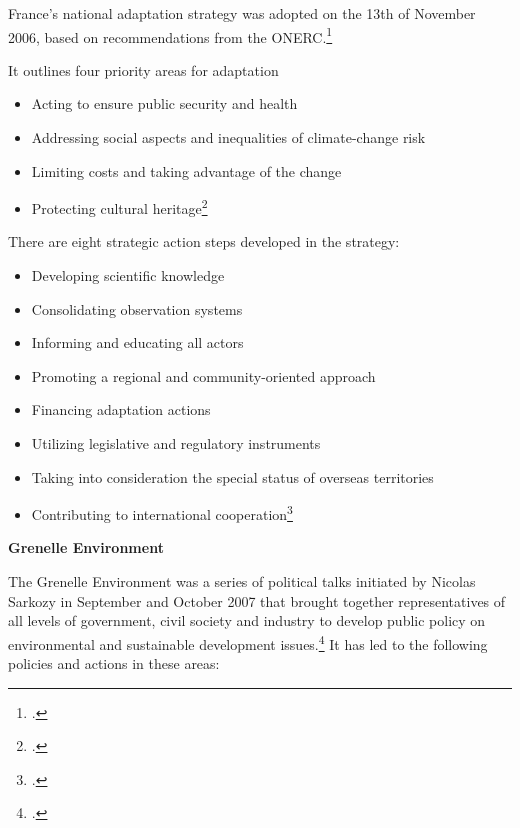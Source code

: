 France's national adaptation strategy was adopted on the 13th of November 2006, based on recommendations from the ONERC.\footcite[][]{SNAAC}


It outlines four priority areas for adaptation
\begin{itemize}
	\item Acting to ensure public security and health
	\item Addressing social aspects and inequalities of climate-change risk
	\item Limiting costs and taking advantage of the change
	\item Protecting cultural heritage\footcite[][]{SNAAC}
\end{itemize}


There are eight strategic action steps developed in the strategy:
\begin{itemize}
	\item Developing scientific knowledge
	\item Consolidating observation systems
	\item Informing and educating all actors
	\item Promoting a regional and community-oriented approach
	\item Financing adaptation actions
	\item Utilizing legislative and regulatory instruments
	\item Taking into consideration the special status of overseas territories
	\item Contributing to international cooperation\footcite[][]{SNAAC}
\end{itemize}



\textbf{Grenelle Environment}



The Grenelle Environment was a series of political talks initiated by Nicolas Sarkozy in September and October 2007 that brought together representatives of all levels of government, civil society and industry to develop public policy on environmental and sustainable development issues.\footcite[][]{GrenelleEnvironment}
It has led to the following policies and actions in these areas:


